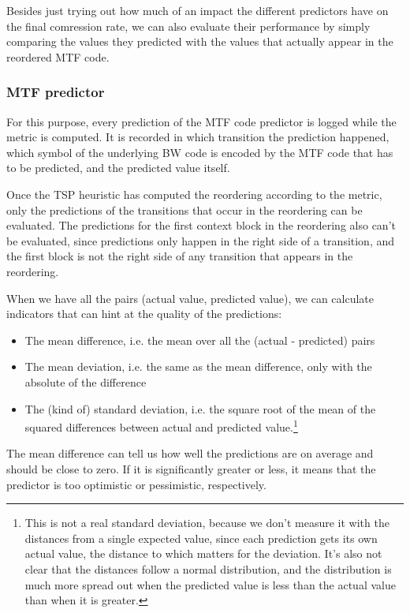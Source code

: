 \documentclass[a4paper]{scrreprt}
\begin{document}
Besides just trying out how much of an impact the different predictors have on
the final comression rate, we can also evaluate their performance by simply
comparing the values they predicted with the values that actually appear in the
reordered MTF code.

\subsubsection{MTF predictor}

For this purpose, every prediction of the MTF code predictor is logged while the
metric is computed. It is recorded in which transition the prediction happened,
which symbol of the underlying BW code is encoded by the MTF code that has to be
predicted, and the predicted value itself.

Once the TSP heuristic has computed the reordering according to the metric,
only the predictions of the transitions that occur in the reordering can be
evaluated. The predictions for the first context block in the reordering also
can't be evaluated, since predictions only happen in the right side of a
transition, and the first block is not the right side of any transition that
appears in the reordering.

When we have all the pairs (actual value, predicted value), we can calculate
indicators that can hint at the quality of the predictions:
\begin{itemize}
  \item The mean difference, i.e. the mean over all the (actual - predicted)
  pairs
  \item The mean deviation, i.e. the same as the mean difference, only with the
  absolute of the difference
  \item The (kind of) standard deviation, i.e. the square root of the mean of
  the squared differences between actual and predicted value.\footnote{This is
  not a real standard deviation, because we don't measure it with the distances
  from a single expected value, since each prediction gets its own actual
  value, the distance to which matters for the deviation. It's also not clear
  that the distances follow a normal distribution, and the distribution is much
  more spread out when the predicted value is less than the actual value than
  when it is greater.}
\end{itemize}

The mean difference can tell us how well the predictions are on average and
should be close to zero. If it is significantly greater or less, it means that
the predictor is too optimistic or pessimistic, respectively.
\end{document}
